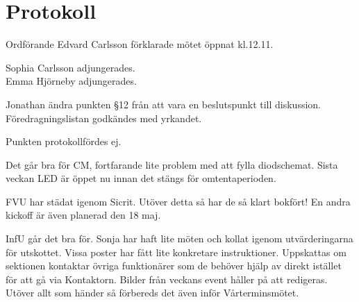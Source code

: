 \documentclass[10pt]{article}
\def\mo{Edvard Carlsson}
\begin{document}
\section*{Protokoll}
\begin{paragrafer}
Ordförande {\mo} förklarade mötet öppnat kl.12.11.

{\valavmo}

{\valavms}

{\valavj}

{\tosg}

Sophia Carlsson adjungerades.\\
Emma Hjörneby adjungerades.


Jonathan \ypa ändra punkten §12 från att vara en beslutspunkt till diskussion. \\
Föredragningslistan godkändes med yrkandet.


\textit{\ingaprot}

\begin{fyllnadsval} %

\end{fyllnadsval}

\begin{paragrafer}
Punkten protokollfördes ej.

Det går bra för CM, fortfarande lite problem med att fylla diodschemat. Sista veckan LED är öppet nu innan det stängs för omtentaperioden.

FVU har städat igenom Sicrit. Utöver detta så har de så klart bokfört! En andra kickoff är även planerad den 18 maj.

InfU går det bra för. Sonja har haft lite möten och kollat igenom utvärderingarna för utskottet. Vissa poster har fått lite konkretare instruktioner. Uppskattas om sektionen kontaktar övriga funktionärer som de behöver hjälp av direkt istället för att gå via Kontaktorn. Bilder från veckans event håller på att redigeras. Utöver allt som händer så förbereds det även inför Vårterminsmötet.


\end{paragrafer}
\end{paragrafer}
\end{document}
